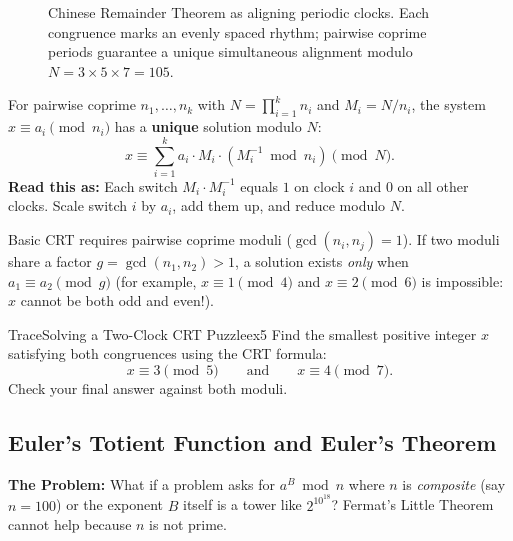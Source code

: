 \documentclass[11pt,a4paper]{article}
\theoremstyle{definition}
\newcommand{\painbeat}{\textbf{\color{accentamber}The Problem:} }
\begin{document}
\begin{figure}[htbp]
\caption{Chinese Remainder Theorem as aligning periodic clocks. Each congruence marks an evenly spaced rhythm; pairwise coprime periods guarantee a unique simultaneous alignment modulo $N = 3 \times 5 \times 7 = 105$.}
\label{fig:crt-clocks}
\end{figure}

\begin{formulabox}
For pairwise coprime $n_1, \dots, n_k$ with $N = \prod_{i=1}^{k} n_i$ and $M_i = N / n_i$, the system $x \equiv a_i \pmod{n_i}$ has a \textbf{unique} solution modulo $N$:
\[
    x \equiv \sum_{i=1}^{k} a_i \cdot M_i \cdot (M_i^{-1} \bmod n_i) \pmod N.
\]
\textbf{Read this as:} Each switch $M_i \cdot M_i^{-1}$ equals $1$ on clock $i$ and $0$ on all other clocks. Scale switch $i$ by $a_i$, add them up, and reduce modulo $N$.
\end{formulabox}

\begin{watchoutbox}
Basic CRT requires pairwise coprime moduli ($\gcd(n_i, n_j) = 1$). If two moduli share a factor $g = \gcd(n_1, n_2) > 1$, a solution exists \emph{only} when $a_1 \equiv a_2 \pmod g$ (for example, $x \equiv 1 \pmod 4$ and $x \equiv 2 \pmod 6$ is impossible: $x$ cannot be both odd and even!).
\end{watchoutbox}

\begin{tryitbox}{Trace}{Solving a Two-Clock CRT Puzzle}{ex5}
Find the smallest positive integer $x$ satisfying both congruences using the CRT formula:
\[
    x \equiv 3 \pmod 5 \qquad \text{and} \qquad x \equiv 4 \pmod 7.
\]
Check your final answer against both moduli.
\end{tryitbox}

\subsection{Euler's Totient Function and Euler's Theorem}

\painbeat What if a problem asks for $a^B \bmod n$ where $n$ is \emph{composite} (say $n = 100$) or the exponent $B$ itself is a tower like $2^{10^{18}}$? Fermat's Little Theorem cannot help because $n$ is not prime.
\end{document}
